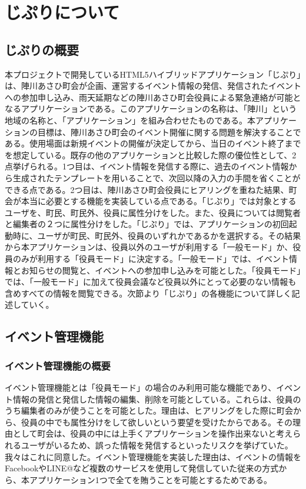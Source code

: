 \chapter{じぷりについて}

\section{じぷりの概要}%
本プロジェクトで開発しているHTML5ハイブリッドアプリケーション「じぷり」は、陣川あさひ町会が企画、運営するイベント情報の発信、発信されたイベントへの参加申し込み、雨天延期などの陣川あさひ町会役員による緊急連絡が可能となるアプリケーションである。このアプリケーションの名称は、「陣川」という地域の名称と、「アプリケーション」を組み合わせたものである。本アプリケーションの目標は、陣川あさひ町会のイベント開催に関する問題を解決することである。使用場面は新規イベントの開催が決定してから、当日のイベント終了までを想定している。既存の他のアプリケーションと比較した際の優位性として、2点挙げられる。1つ目は、イベント情報を発信する際に、過去のイベント情報から生成されたテンプレートを用いることで、次回以降の入力の手間を省くことができる点である。2つ目は、陣川あさひ町会役員にヒアリングを重ねた結果、町会が本当に必要とする機能を実装している点である。「じぷり」では対象とするユーザを、町民、町民外、役員に属性分けをした。また、役員については閲覧者と編集者の２つに属性分けをした。「じぷり」では、アプリケーションの初回起動時に、ユーザが町民、町民外、役員のいずれかであるかを選択する。その結果から本アプリケーションは、役員以外のユーザが利用する「一般モード」か、役員のみが利用する「役員モード」に決定する。「一般モード」では、イベント情報とお知らせの閲覧と、イベントへの参加申し込みを可能とした。「役員モード」では、「一般モード」に加えて役員会議など役員以外にとって必要のない情報も含めすべての情報を閲覧できる。次節より「じぷり」の各機能について詳しく記述していく。

\section{イベント管理機能}%
\subsection{イベント管理機能の概要}%
イベント管理機能とは「役員モード」の場合のみ利用可能な機能であり、イベント情報の発信と発信した情報の編集、削除を可能としている。これらは、役員のうち編集者のみが使うことを可能とした。理由は、ヒアリングをした際に町会から、役員の中でも属性分けをして欲しいという要望を受けたからである。その理由として町会は、役員の中には上手くアプリケーションを操作出来ないと考えられるユーザがいるため、誤った情報を発信するといったリスクを挙げていた。我々はこれに同意した。イベント管理機能を実装した理由は、イベントの情報をFacebookやLINE@など複数のサービスを使用して発信していた従来の方式から、本アプリケーション1つで全てを賄うことを可能とするためである。

